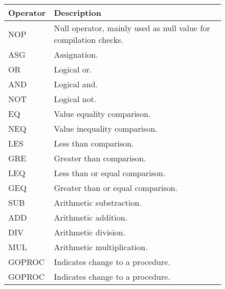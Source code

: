 \begin{figure}[h]
    \centering
    \begin{tabular}{p{1in}p{3in}}
        \toprule
        \textbf{Operator} & \textbf{Description}\\
        \midrule NOP &
        Null operator, mainly used as null value for \newline compilation checks.\\

        \midrule ASG &
        Assignation.\\

        \midrule OR &
        Logical or.\\

        \midrule AND &
        Logical and.\\

        \midrule NOT &
        Logical not.\\

        \midrule EQ &
        Value equality comparison.\\

        \midrule NEQ &
        Value inequality comparison.\\

        \midrule LES &
        Less than comparison.\\

        \midrule GRE &
        Greater than comparison.\\

        \midrule LEQ &
        Less than or equal comparison.\\

        \midrule GEQ &
        Greater than or equal comparison.\\

        \midrule SUB &
        Arithmetic substraction.\\

        \midrule ADD &
        Arithmetic addition.\\

        \midrule DIV &
        Arithmetic division.\\

        \midrule MUL &
        Arithmetic multiplication.\\

        \midrule GOPROC &
        Indicates change to a procedure.\\

        \midrule GOPROC &
        Indicates change to a procedure.\\


\end{tabular}
\end{figure}
